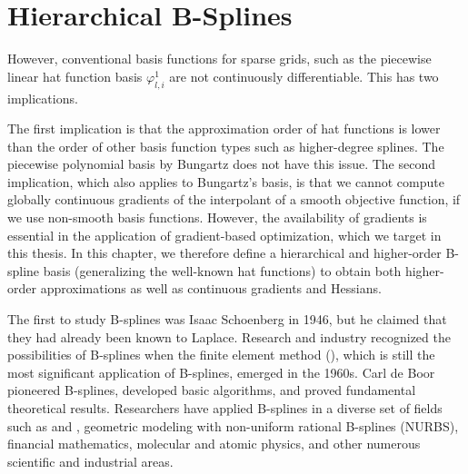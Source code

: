 
\chapter{Hierarchical B-Splines}
\label{chap:30BSplines}





However, conventional basis functions for sparse grids,
such as the piecewise linear hat function basis $\varphi_{l,i}^1$
are not continuously differentiable.
This has two implications.

The first implication is that the approximation order of hat functions
is lower than the order of other basis function types
such as higher-degree splines.
The piecewise polynomial basis by Bungartz \cite{Bungartz98Finite}
does not have this issue.
The second implication, which also applies to Bungartz's basis,
is that we cannot compute globally continuous gradients of the
interpolant of a smooth objective function,
if we use non-smooth basis functions.
However, the availability of gradients is
essential in the application of gradient-based optimization,
which we target in this thesis.
In this chapter, we therefore define a hierarchical and
higher-order B-spline basis
(generalizing the well-known hat functions)
to obtain both higher-order approximations
as well as continuous gradients and Hessians.

The first to study B-splines was Isaac Schoenberg in 1946,
but he claimed that they had already been known to Laplace.
%
Research and industry recognized the possibilities of B-splines when
the finite element method (\fem),
which is still the most significant application of B-splines,
emerged in the 1960s.
Carl de Boor pioneered B-splines, developed basic algorithms, and
proved fundamental theoretical results.
Researchers have applied B-splines in a diverse set of fields such as
%
\fem and \iga,
geometric modeling with non-uniform rational B-splines (NURBS),
financial mathematics,
molecular and atomic physics,
and other numerous scientific and industrial areas.

